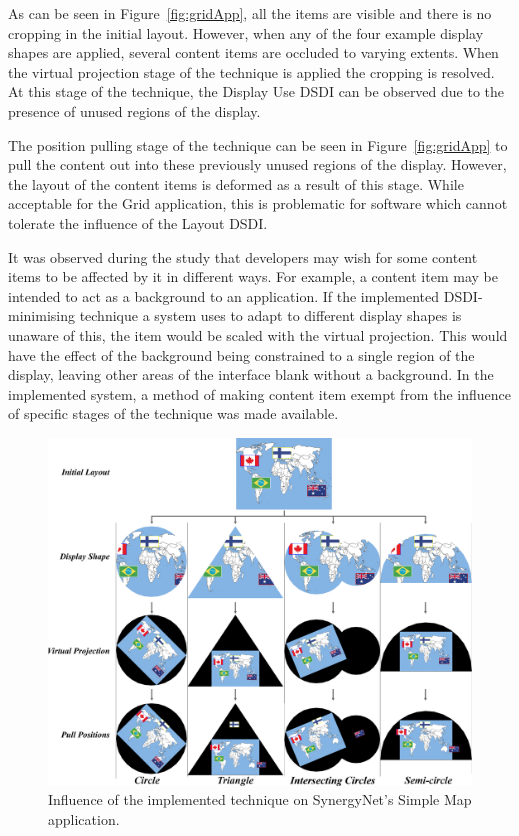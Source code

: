 \documentclass[review,5p,times,twocolumn]{elsarticle}
\begin{document}
As can be seen in Figure~\ref{fig:gridApp}, all the items are visible and there is no cropping in the initial layout.
However, when any of the four example display shapes are applied, several content items are occluded to varying extents.
When the virtual projection stage of the technique is applied the cropping is resolved.
At this stage of the technique, the Display Use \ac{DSDI} can be observed due to the presence of unused regions of the display.

The position pulling stage of the technique can be seen in Figure~\ref{fig:gridApp} to pull the content out into these previously unused regions of the display.
However, the layout of the content items is deformed as a result of this stage.
While acceptable for the Grid application, this is problematic for software which cannot tolerate the influence of the Layout \ac{DSDI}.

It was observed during the study that developers may wish for some content items to be affected by it in different ways.
For example, a content item may be intended to act as a background to an application.
If the implemented \ac{DSDI}-minimising technique a system uses to adapt to different display shapes is unaware of this, the item would be scaled with the virtual projection.
This would have the effect of the background being constrained to a single region of the display, leaving other areas of the interface blank without a background.
In the implemented system, a method of making content item exempt from the influence of specific stages of the technique was made available.

\begin{figure}[t!] 
	\centerline{\includegraphics[width=1\textwidth]{figures/map_app.png}}
	\caption{Influence of the implemented technique on SynergyNet's Simple Map application.}
	\label{fig:mapApp}
\end{figure}
\end{document}
